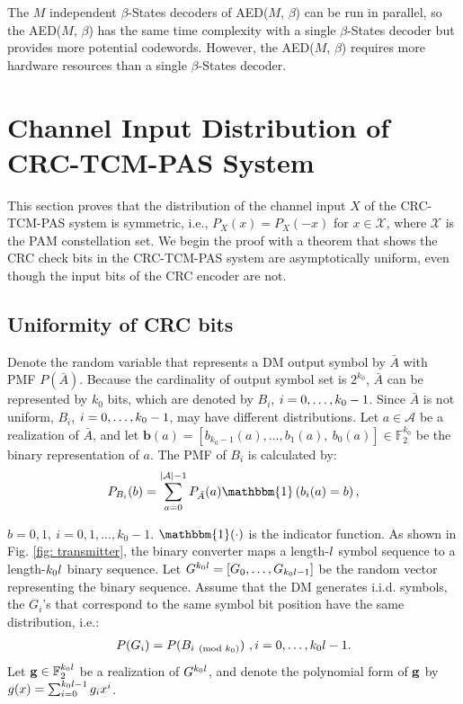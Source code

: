 \documentclass [PhD] {uclathes}
\begin{document}
The $M$ independent $\beta$-States decoders of AED($M$, $\beta$) can be run in parallel, so the AED($M$, $\beta$) has the same time complexity with a single $\beta$-States decoder but provides  more potential codewords. However, the AED($M$, $\beta$) requires more hardware resources than a single $\beta$-States decoder.

\section{Channel Input Distribution of CRC-TCM-PAS System }\label{sec: property}
This section proves that the distribution of the channel input $X$ of the CRC-TCM-PAS system is symmetric, i.e., $P_X(x)=P_X(-x)$ for $x\in\mathcal{X}$, where $\mathcal{X}$ is the PAM constellation set. We begin the proof with a theorem that shows the CRC check bits in the CRC-TCM-PAS system are asymptotically uniform, even though the input bits of the CRC encoder are not.

\subsection{Uniformity of CRC bits}
Denote the random variable that represents a DM output symbol by $\bar{A}$ with PMF  $P(\bar{A})$. Because the cardinality of output symbol set is $2^{k_0}$, $\bar{A}$ can be represented by $k_0$ bits, which are denoted by $B_i$, $i=0,\ldots,k_0-1$.
Since $\bar{A}$ is not uniform,  $B_i$, $i=0,\ldots,k_0-1$, may have different distributions. Let $a\in\mathcal{A}$ be a realization of $\bar{A}$, and  let $\mathbf{b}(a)=[b_{k_0-1}(a),\dots, b_{1}(a),~b_{0}(a)]\in\mathbb{F}_2^{k_0}$ be the binary representation of $a$.  The PMF of $B_i$ is calculated by:
\begin{align}\label{equ: distribution}
    P_{B_i}(b)=\sum_{a=0}^{|\mathcal{A}|-1}P_{{\bar{A}}}(a)\mathbbm{1}\left(b_i(a)=b\right),
\end{align}

$b=0,1,~i=0,1,...,k_0-1$. $\mathbbm{1}(\cdot)$ is the indicator function. As shown in Fig. \ref{fig: transmitter}, the binary converter maps a length-$l$ symbol sequence to a length-$k_0l$ binary sequence.  Let $G^{k_0l}=[G_0,\ldots,G_{k_0 l -1}]$ be the random vector representing the binary sequence. Assume that the DM generates i.i.d. symbols, the $G_i$'s that correspond to the same symbol bit position have the same distribution, i.e.:
\begin{align}\label{equ: prob_gi}
    P(G_i)=P(B_{i\pmod{k_0}} )~,i=0,\ldots,k_0l-1.
\end{align}
Let $\mathbf{g}\in\mathbb{F}_2^{k_0l}$ be a realization of $G^{k_0l}$, and denote the polynomial form of $\mathbf{g}$ by $g(x)=\sum_{i=0}^{k_0l-1}g_ix^i$.
\end{document}
